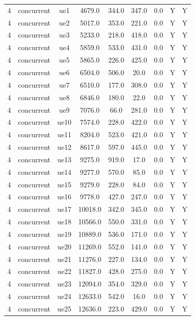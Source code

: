 \begin{table}[ht]
\begin{tabular}{|c|c|c|c|c|c|c|c|c|}
\hline
4 & concurrent & ue1 & 4679.0 & 344.0 & 347.0 & 0.0 & Y & Y \\
4 & concurrent & ue2 & 5017.0 & 353.0 & 221.0 & 0.0 & Y & Y \\
4 & concurrent & ue3 & 5233.0 & 218.0 & 418.0 & 0.0 & Y & Y \\
4 & concurrent & ue4 & 5859.0 & 533.0 & 431.0 & 0.0 & Y & Y \\
4 & concurrent & ue5 & 5865.0 & 226.0 & 425.0 & 0.0 & Y & Y \\
4 & concurrent & ue6 & 6504.0 & 506.0 & 20.0 & 0.0 & Y & Y \\
4 & concurrent & ue7 & 6510.0 & 177.0 & 308.0 & 0.0 & Y & Y \\
4 & concurrent & ue8 & 6846.0 & 180.0 & 22.0 & 0.0 & Y & Y \\
4 & concurrent & ue9 & 7076.0 & 66.0 & 281.0 & 0.0 & Y & Y \\
4 & concurrent & ue10 & 7574.0 & 228.0 & 422.0 & 0.0 & Y & Y \\
4 & concurrent & ue11 & 8204.0 & 523.0 & 421.0 & 0.0 & Y & Y \\
4 & concurrent & ue12 & 8617.0 & 597.0 & 445.0 & 0.0 & Y & Y \\
4 & concurrent & ue13 & 9275.0 & 919.0 & 17.0 & 0.0 & Y & Y \\
4 & concurrent & ue14 & 9277.0 & 570.0 & 85.0 & 0.0 & Y & Y \\
4 & concurrent & ue15 & 9279.0 & 228.0 & 84.0 & 0.0 & Y & Y \\
4 & concurrent & ue16 & 9778.0 & 427.0 & 247.0 & 0.0 & Y & Y \\
4 & concurrent & ue17 & 10018.0 & 342.0 & 345.0 & 0.0 & Y & Y \\
4 & concurrent & ue18 & 10566.0 & 550.0 & 331.0 & 0.0 & Y & Y \\
4 & concurrent & ue19 & 10889.0 & 536.0 & 171.0 & 0.0 & Y & Y \\
4 & concurrent & ue20 & 11269.0 & 552.0 & 141.0 & 0.0 & Y & Y \\
4 & concurrent & ue21 & 11276.0 & 227.0 & 134.0 & 0.0 & Y & Y \\
4 & concurrent & ue22 & 11827.0 & 428.0 & 275.0 & 0.0 & Y & Y \\
4 & concurrent & ue23 & 12094.0 & 354.0 & 329.0 & 0.0 & Y & Y \\
4 & concurrent & ue24 & 12633.0 & 542.0 & 16.0 & 0.0 & Y & Y \\
4 & concurrent & ue25 & 12636.0 & 223.0 & 429.0 & 0.0 & Y & Y \\

\end{tabular}
\end{table}
